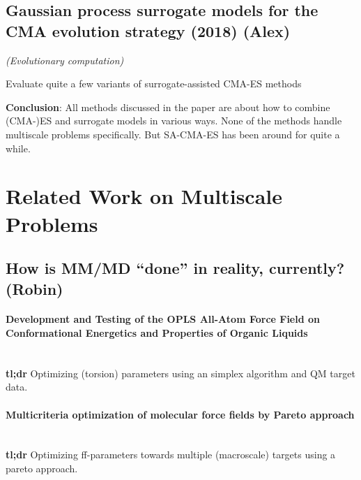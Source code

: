 \documentclass[preprint,12pt]{elsarticle}
\begin{document}
\subsection{Gaussian process surrogate models for the CMA evolution strategy (2018) (Alex)}
\textit{(Evolutionary computation)} \cite{bajer2019gaussian}

Evaluate quite a few variants of surrogate-assisted CMA-ES methods

\textbf{Conclusion}: All methods discussed in the paper are about how to combine (CMA-)ES and surrogate models in various ways. None of the methods handle multiscale problems specifically. But SA-CMA-ES has been around for quite a while.







\noindent\makebox[\linewidth]{\rule{\paperwidth}{0.4pt}}

\section{Related Work on Multiscale Problems}



\subsection{How is MM/MD ``done'' in reality, currently? (Robin)}
\paragraph{Development and Testing of the OPLS All-Atom Force Field on Conformational Energetics and Properties of Organic Liquids}
\cite{Jorgensen2996} 
\\ \textbf{tl;dr} Optimizing (torsion) parameters using an simplex algorithm and QM target data.

\paragraph{Multicriteria optimization of molecular force fields by Pareto approach}
\cite{Stoebener2014} 
\\ \textbf{tl;dr} Optimizing ff-parameters towards multiple (macroscale) targets using a pareto approach. 
\end{document}
